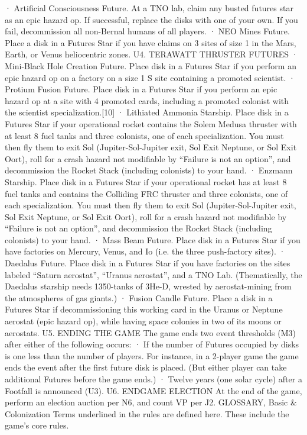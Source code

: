 \documentclass[a4paper]{book}
\begin{document}
·   	Artificial Consciousness Future. At a TNO lab, claim any busted futures star as an epic hazard op. If successful, replace the disks with one of your own. If you fail, decommission all non-Bernal humans of all players.
·   	NEO Mines Future. Place a disk in a Futures Star if you have claims on 3 sites of size 1 in the Mars, Earth, or Venus heliocentric zones.
U4. TERAWATT THRUSTER FUTURES
·       Mini-Black Hole Creation Future. Place disk in a Futures Star if you perform an epic hazard op on a factory on a size 1 S site containing a promoted scientist.
·       Protium Fusion Future. Place disk in a Futures Star if you perform an epic hazard op at a site with 4 promoted cards, including a promoted colonist with the scientist specialization.[10]
·   	Lithiated Ammonia Starship. Place disk in a Futures Star if your operational rocket contains the Solem Medusa thruster with at least 8 fuel tanks and three colonists, one of each specialization. You must then fly them to exit Sol (Jupiter-Sol-Jupiter exit, Sol Exit Neptune, or Sol Exit Oort), roll for a crash hazard not modifiable by “Failure is not an option”, and decommission the Rocket Stack (including colonists) to your hand.
·       Enzmann Starship. Place disk in a Futures Star if your operational rocket has at least 8 fuel tanks and contains the Colliding FRC thruster and three colonists, one of each specialization. You must then fly them to exit Sol (Jupiter-Sol-Jupiter exit, Sol Exit Neptune, or Sol Exit Oort), roll for a crash hazard not modifiable by “Failure is not an option”, and decommission the Rocket Stack (including colonists) to your hand.
·       Mass Beam Future. Place disk in a Futures Star if you have factories on Mercury, Venus, and Io (i.e. the three push-factory sites).
·       Daedalus Future. Place disk in a Futures Star if you have factories on the sites labeled “Saturn aerostat”, “Uranus aerostat”, and a TNO Lab. (Thematically, the Daedalus starship needs 1350-tanks of 3He-D, wrested by aerostat-mining from the atmospheres of gas giants.)
·       Fusion Candle Future. Place a disk in a Futures Star if decommissioning this working card in the Uranus or Neptune aerostat (epic hazard op), while having space colonies in two of its moons or aerostats.
U5. ENDING THE GAME
The game ends two event thresholds (M3) after either of the following occurs:
·       If the number of Futures occupied by disks is one less than the number of players. For instance, in a 2-player game the game ends the event after the first future disk is placed. (But either player can take additional Futures before the game ends.)
·       Twelve years (one solar cycle) after a Footfall is announced (U3).
U6. ENDGAME ELECTION
At the end of the game, perform an election auction per N6, and count VP per J2.
GLOSSARY, Basic \& Colonization
Terms underlined in the rules are defined here. These include the game’s core rules.
\end{document}
